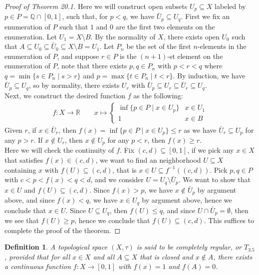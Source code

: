 \documentclass[11pt]{book}
\theoremstyle{break}
\theoremstyle{break}
\newtheorem{defn}{Definition}[corL]
\newcommand{\R}{\mathbb{R}}
\newcommand{\Q}{\mathbb{Q}}
\begin{document}
\begin{proof}[Proof of Theorem 20.1]
Here we will construct open subsets $U_p \subseteq X$ labeled by $p \in P = \Q \cap [0,1]$, such that, for $p<q$, we have $\bar{U}_p \subseteq U_q$. First we fix an enumeration of $P$ such that $1$ and $0$ are the first two elements on the enumeration. Let $U_1 = X\setminus B$. By the normality of $X$, there exists open $U_0$ such that $A \subseteq U_0 \subseteq \bar{U}_0 \subseteq X\setminus B = U_1$. Let $P_n$ be the set of the first $n$-elements in the enumeration of $P$, and suppose $r \in P$ is the $(n+1)$-st element on the enumeration of $P$, note that there exists $p,q \in P_n$ with $p<r<q$ where $q =\min\{s \in P_n \mid s>r\}$ and $p = \max\{t \in P_n \mid t<r\}$. By induction, we have $\bar{U}_p \subseteq U_q$, so by normality, there exists $U_r$ with $\bar{U}_p \subseteq U_r \subseteq \bar{U}_r \subseteq U_q$.\\

Next, we construct the desired function $f$ as the following:
\begin{align*}
f:X \to \R \qquad x\mapsto \begin{cases}
\inf\{p \in P \mid x \in U_p \} & x \in U_1\\
1 & x\in B
\end{cases}
\end{align*} 
Given $r$, if $x \in \bar{U}_r$, then $f(x) = \inf\{p \in P \mid x \in U_p\}\leq r$ as we have $\bar{U}_r \subseteq U_p$ for any $p>r$. If $x \notin U_r$, then $x \notin U_p$ for any $p<r$, then $f(x) \geq r$. \\

Here we will check the continuity of $f$. Fix $(c,d) \subseteq [0,1]$, if we pick any $x \in X$ that satisfies $f(x) \in (c,d)$, we want to find an neighborhood $U\subseteq X$ containing $x$ with $f(U) \subseteq (c,d)$, that is $x \in U \subseteq f^{-1}((c,d))$. Pick $p,q \in P$ with $c<p< f(x) < q< d$, and we consider $U = U_q \setminus \bar{U}_p$. We want to show that $x \in U$ and $f(U) \subseteq (c,d)$. Since $f(x) >p$, we have $x \notin \bar{U}_p$ by argument above, and since $f(x) <q$, we have $x \in U_q$ by argument above, hence we conclude that $x \in U$. Since $U \subseteq U_q$, then $f(U) \leq q$, and since $U \cap \bar{U}_p  = \emptyset$, then we see that $f(U) \geq p$, hence we conclude that $f(U )\subseteq (c,d)$. This suffices to complete the proof of the theorem.  
\end{proof}


\begin{defn}
A topological space $(X,\tau)$ is said to be completely regular, or $T_{3.5}$, provided that for all $x \in X$ and all $A \subseteq X$ that is closed and $x \notin A$, there exists a continuous function $f:X \to [0,1]$ with $f(x) = 1$ and $f(A) = 0$. 
\end{defn}
\end{document}
